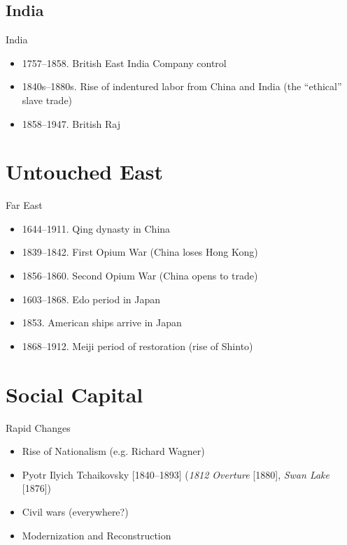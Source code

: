 \subsection{India}
\begin{frame}{India}
	\begin{itemize}
		\item<2->1757--1858. British East India Company control
		\item<3->1840s--1880s. Rise of indentured labor from China and India (the ``ethical'' slave trade)
		\item<4->1858--1947. British Raj
	\end{itemize}
\end{frame}

\section{Untouched East}
\begin{frame}{Far East}
	\begin{itemize}
		\item<1-6>1644--1911. Qing dynasty in China
		\item<2-6>1839--1842. First Opium War (China loses Hong Kong)
		\item<3-6>1856--1860. Second Opium War (China opens to trade)
		\item<4-6>1603--1868. Edo period in Japan
		\item<5-6>1853. American ships arrive in Japan
		\item<6>1868--1912. Meiji period of restoration (rise of Shinto)
	\end{itemize}
\end{frame}


\section{Social Capital}
\begin{frame}{Rapid Changes}
	\begin{itemize}
		\item<1->Rise of Nationalism (e.g. Richard Wagner)
		\item<1->Pyotr Ilyich Tchaikovsky [1840--1893] (\emph{1812 Overture} [1880], \emph{Swan Lake} [1876])
		\item<1->Civil wars (everywhere?)
		\item<1->Modernization and Reconstruction
	\end{itemize}
\end{frame}


